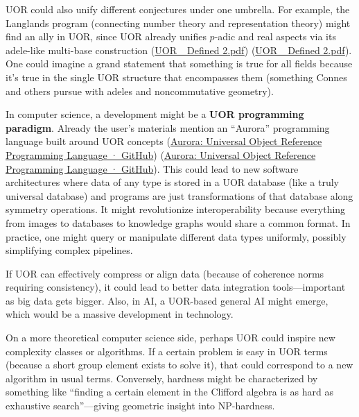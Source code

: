 \documentclass[12pt]{article}
\begin{document}
\medskip

UOR could also unify different conjectures under one umbrella. For example, the Langlands program (connecting number theory and representation theory) might find an ally in UOR, since UOR already unifies $p$-adic and real aspects via its adele-like multi-base construction (\href{file://file-TBF3nHDaRR5QeVMmwCFYkp#:~:text=%E2%97%8F%20Ad%C3%A8les%20and%20Global%20Fields%3A,kind%20of%20product%20of%20local}{UOR\_ Defined 2.pdf}) (\href{file://file-TBF3nHDaRR5QeVMmwCFYkp#:~:text=of%20collecting%20all%20base,of%20components%20%E2%80%93%20in%20practice}{UOR\_ Defined 2.pdf}). One could imagine a grand statement that something is true for all fields because it's true in the single UOR structure that encompasses them (something Connes and others pursue with adeles and noncommutative geometry).

\medskip

In computer science, a development might be a \textbf{UOR programming paradigm}. Already the user’s materials mention an “Aurora” programming language built around UOR concepts (\href{https://gist.github.com/usrbinkat/b3dec2d106bd0a254192d09bf8f17694#:~:text=Aurora%3A%20Universal%20Object%20Reference%20Programming,framework%27s%20advanced%20algebraic%20and}{Aurora: Universal Object Reference Programming Language · GitHub}) (\href{https://gist.github.com/usrbinkat/b3dec2d106bd0a254192d09bf8f17694#:~:text=Clifford%20Algebra%20Backbone%3A%20All%20UOR,Data}{Aurora: Universal Object Reference Programming Language · GitHub}). This could lead to new software architectures where data of any type is stored in a UOR database (like a truly universal database) and programs are just transformations of that database along symmetry operations. It might revolutionize interoperability because everything from images to databases to knowledge graphs would share a common format. In practice, one might query or manipulate different data types uniformly, possibly simplifying complex pipelines.

\medskip

If UOR can effectively compress or align data (because of coherence norms requiring consistency), it could lead to better data integration tools---important as big data gets bigger. Also, in AI, a UOR-based general AI might emerge, which would be a massive development in technology.

\medskip

On a more theoretical computer science side, perhaps UOR could inspire new complexity classes or algorithms. If a certain problem is easy in UOR terms (because a short group element exists to solve it), that could correspond to a new algorithm in usual terms. Conversely, hardness might be characterized by something like ``finding a certain element in the Clifford algebra is as hard as exhaustive search''---giving geometric insight into NP-hardness.
\end{document}
